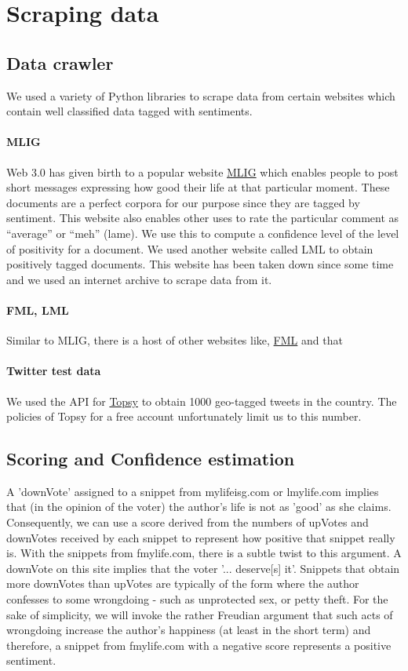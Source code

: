 \documentclass[11pt, letterpaper, conference, final, twocolumn]{ieeeconf}
\newcommand{\pcm}[2]{{\dg #1}\marginpar{\tiny\noindent{\raggedright{\dg[PC]}\br{ #2} \par}}}
\begin{document}
\section{Scraping data}
\label{sec:data}

\subsection{Data crawler}
\label{ssec:crawler}

We used a variety of Python libraries to scrape data from certain websites which contain well classified data tagged with sentiments.
\paragraph{MLIG}
Web 3.0 has given birth to a popular website \href{http://mylifeisg.com}{MLIG} which enables people to post short messages expressing how good their life at that particular moment. These documents are a perfect corpora for our purpose since they are tagged by sentiment. This website also enables other uses to rate the particular comment as ``average'' or ``meh'' (lame). We use this to compute a confidence level of the level of positivity for a document. We used another website called LML to obtain positively tagged documents. \pcm{This website has been taken down since some time and we used an internet archive to scrape data from it.}{fix}
\paragraph{FML, LML}
Similar to MLIG, there is a host of other websites like, \href{fmylife.com}{FML} and  that 
\paragraph{Twitter test data}
We used the API for \href{topsy.com}{Topsy} to obtain 1000 geo-tagged tweets in the country. The policies of Topsy for a free account unfortunately limit us to this number.

\subsection{Scoring and Confidence estimation}
\label{ssec:scoring}

A 'downVote' assigned to a snippet from mylifeisg.com or lmylife.com implies
that (in the opinion of the voter) the author's life is not as 'good' as she
claims. Consequently, we can use a score derived from the numbers of upVotes
and downVotes received by each snippet to represent how positive that snippet
really is. With the snippets from fmylife.com, there is a subtle twist to this
argument. A downVote on this site implies that the voter '... deserve[s] it'.
Snippets that obtain more downVotes than upVotes are typically of the form
where the author confesses to some wrongdoing - such as unprotected sex, or
petty theft. For the sake of simplicity, we will invoke the rather Freudian
argument that such acts of wrongdoing increase the author's happiness (at least
in the short term) and therefore, a snippet from fmylife.com with a negative
score represents a positive sentiment.
\end{document}
